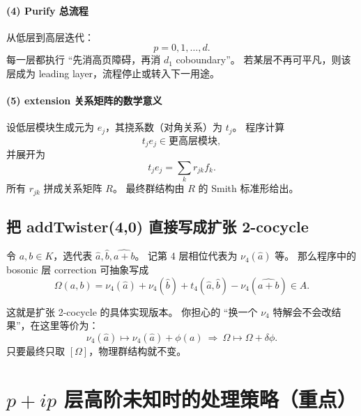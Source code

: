 \documentclass[a4paper,fontset=ubuntu,12pt]{ctexart}
\begin{document}
\paragraph{(4) Purify 总流程}
从低层到高层迭代：
\begin{equation}
p=0,1,\dots,d.
\label{eq:purify-order}
\end{equation}
每一层都执行 ``先消高页障碍，再消 $d_1$ coboundary''。
若某层不再可平凡，则该层成为 leading layer，流程停止或转入下一用途。

\paragraph{(5) extension 关系矩阵的数学意义}
设低层模块生成元为 $e_j$，其挠系数（对角关系）为 $t_j$。
程序计算
\begin{equation}
t_j e_j \in \text{更高层模块},
\label{eq:tjej}
\end{equation}
并展开为
\begin{equation}
t_j e_j = \sum_k r_{jk} f_k.
\label{eq:relation-rjk}
\end{equation}
所有 $r_{jk}$ 拼成关系矩阵 $R$。
最终群结构由 $R$ 的 Smith 标准形给出。

\subsection{把 addTwister(4,0) 直接写成扩张 2-cocycle}

令 $a,b\in K$，选代表 $\hat a,\hat b,\widehat{a+b}$。
记第 4 层相位代表为 $\nu_4(\hat a)$ 等。
那么程序中的 bosonic 层 correction 可抽象写成
\begin{equation}
\Omega(a,b)=
\nu_4(\hat a)+\nu_4(\hat b)+t_4(\hat a,\hat b)-\nu_4(\widehat{a+b})
\in A.
\label{eq:Omega-from-t4}
\end{equation}

这就是扩张 2-cocycle 的具体实现版本。
你担心的 ``换一个 $\nu_4$ 特解会不会改结果''，在这里等价为：
\begin{equation}
\nu_4(\hat a)\mapsto \nu_4(\hat a)+\phi(a)
\ \Longrightarrow\
\Omega\mapsto \Omega+\delta\phi.
\label{eq:Omega-coboundary-shift}
\end{equation}
只要最终只取 $[\Omega]$，物理群结构就不变。

\section{$p+ip$ 层高阶未知时的处理策略（重点）}
\label{sec:ppip-strategy}
\end{document}
